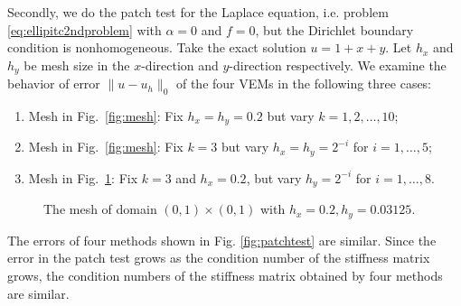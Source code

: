 \documentclass[10pt]{amsart}
\theoremstyle{definition}
\theoremstyle{remark}
\begin{document}
\begin{enumerate}[1.]
Secondly, we do the patch test for the Laplace equation, i.e. problem \eqref{eq:ellipitc2ndproblem} with $\alpha = 0$ and $f=0$, but the Dirichlet boundary condition is nonhomogeneous. Take the exact solution $u=1+x+y$. %
Let $h_x$ and $h_y$ be mesh size in the $x$-direction and
$y$-direction respectively.
We examine the behavior of error $\|u - u_h\|_0$ of the four VEMs in the
following three cases:
\begin{enumerate}[(1)]
\item Mesh in Fig.~\ref{fig:mesh}: Fix $h_x=h_y=0.2$ but vary $k= 1, 2, \ldots, 10$;
\item Mesh in Fig.~\ref{fig:mesh}: Fix $k=3$ but vary $h_x=h_y=2^{-i}$ for $i=1,\ldots, 5$;
\item Mesh in Fig.~\ref{fig:polymesh}: Fix $k=3$ and $h_x=0.2$, but vary $h_y=2^{-i}$ for $i=1,\ldots, 8$.
\end{enumerate}
\begin{figure}[htbp]
\centering
\caption{The mesh of domain $(0, 1)\times(0, 1)$ with
$h_x=0.2, h_y = 0.03125$.}
  \label{fig:polymesh} %
\end{figure}
The errors of four methods shown in Fig. \ref{fig:patchtest} are similar. 
Since the error in the patch test
grows as the condition number of the stiffness matrix grows, 
the condition numbers of the stiffness matrix obtained by
four methods are similar.
\begin{figure}[htbp]
\centering
{}

\end{figure}
\end{enumerate}
\end{document}
